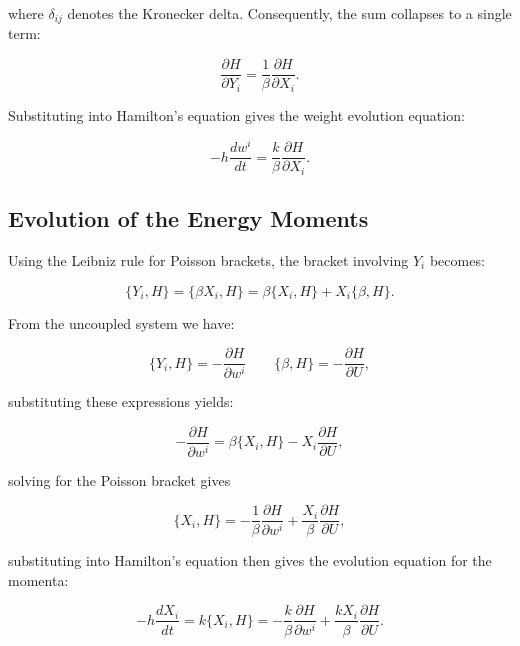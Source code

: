 \documentclass[12pt]{article}
\begin{document}
where $\delta_{ij}$ denotes the Kronecker delta. Consequently, the sum collapses to a single term:

\begin{equation}
\frac{\partial H}{\partial Y_{i}} = \frac{1}{\beta} \frac{\partial H}{\partial X_{i}}.
\end{equation}

Substituting into Hamilton’s equation gives the weight evolution equation:

\begin{equation}
-h\frac{dw^{i}}{dt} = \frac{k}{\beta} \frac{\partial H}{\partial X_{i}}.
\end{equation}

\subsection*{Evolution of the Energy Moments}

Using the Leibniz rule for Poisson brackets, the bracket involving $Y_i$ becomes:

\begin{equation}
\{Y_{i}, H\} = \{\beta X_{i}, H\} = \beta\{X_{i}, H\} + X_{i}\{\beta, H\}.
\end{equation}

From the uncoupled system we have:

\begin{equation}
\{Y_{i}, H \} = -\frac{\partial H}{\partial w^{i}} \qquad  \{\beta, H\} = -\frac{\partial H}{\partial U},
\end{equation}

substituting these expressions yields:

\begin{equation}
-\frac{\partial H}{\partial w^{i}} = \beta \{X_{i}, H\} - X_{i} \frac{\partial H}{\partial U},
\end{equation}

solving for the Poisson bracket gives

\begin{equation}
\{X_{i}, H\} = -\frac{1}{\beta}\frac{\partial H}{\partial w^{i}} + \frac{X_{i}}{\beta} \frac{\partial H}{\partial U},
\end{equation}

substituting into Hamilton’s equation then gives the evolution equation for the momenta:

\begin{equation}
-h\frac{dX_{i}}{dt} = k\{X_{i}, H\} = -\frac{k}{\beta}\frac{\partial H}{\partial w^{i}} + \frac{kX_{i}}{\beta} \frac{\partial H}{\partial U}.
\end{equation}
\end{document}
